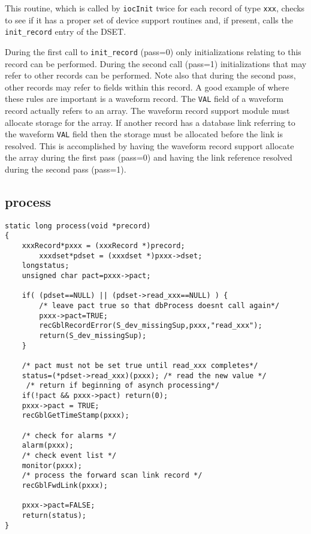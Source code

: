 This routine, which is called by \verb|iocInit| twice for each record of type \verb|xxx|, checks to see if it has a proper set of device 
support routines and, if present, calls the \verb|init_record| entry of the DSET.

During the first call to \verb|init_record| (pass=0) only initializations relating to this record can be performed. During the 
second call (pass=1) initializations that may refer to other records can be performed. Note also that during the second 
pass, other records may refer to fields within this record. A good example of where these rules are important is a 
waveform record. The \verb|VAL| field of a waveform record actually refers to an array. The waveform record support module 
must allocate storage for the array. If another record has a database link referring to the waveform \verb|VAL| field then the 
storage must be allocated before the link is resolved. This is accomplished by having the waveform record support 
allocate the array during the first pass (pass=0) and having the link reference resolved during the second pass (pass=1).

\subsection{process}

\begin{verbatim}
static long process(void *precord)
{
    xxxRecord*pxxx = (xxxRecord *)precord;
        xxxdset*pdset = (xxxdset *)pxxx->dset;
    longstatus;
    unsigned char pact=pxxx->pact;

    if( (pdset==NULL) || (pdset->read_xxx==NULL) ) {
        /* leave pact true so that dbProcess doesnt call again*/
        pxxx->pact=TRUE;
        recGblRecordError(S_dev_missingSup,pxxx,"read_xxx");
        return(S_dev_missingSup);
    }

    /* pact must not be set true until read_xxx completes*/
    status=(*pdset->read_xxx)(pxxx); /* read the new value */
     /* return if beginning of asynch processing*/
    if(!pact && pxxx->pact) return(0);
    pxxx->pact = TRUE;
    recGblGetTimeStamp(pxxx);

    /* check for alarms */
    alarm(pxxx);
    /* check event list */
    monitor(pxxx);
    /* process the forward scan link record */
    recGblFwdLink(pxxx);

    pxxx->pact=FALSE;
    return(status);
}
\end{verbatim}

